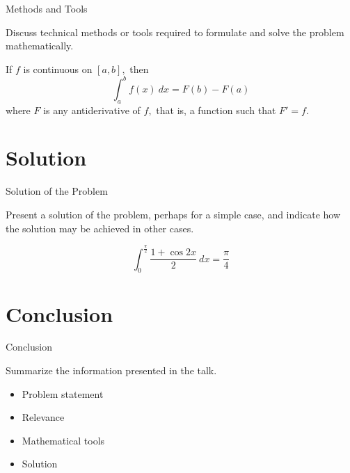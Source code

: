 \documentclass{beamer}
\begin{document}
\begin{frame}{Methods and Tools}

Discuss technical methods or tools required to formulate and solve the problem mathematically.

\bigskip

\begin{theorem}
If $f$ is continuous on $[a,b],$ then
$$\int_{a}^{b} f(x) \: dx = F(b) - F(a)$$
where $F$ is any antiderivative of $f,$ that is, a function such that $F' = f.$
\end{theorem}

\end{frame}



\section{Solution}

\begin{frame}{Solution of the Problem}

Present a solution of the problem, perhaps for a simple case, and indicate how the solution may be achieved in other cases.

\bigskip

\begin{example}
\[ \int_0^\frac{\pi}{2}\frac{1+\cos 2x}{2} \: dx=\frac{\pi}{4}  \]
\end{example}

\end{frame}



\section{Conclusion}

\begin{frame}{Conclusion}

Summarize the information presented in the talk.

\bigskip

\begin{itemize}
\item Problem statement
\item Relevance
\item Mathematical tools
\item Solution
\end{itemize}

\end{frame}
\end{document}
